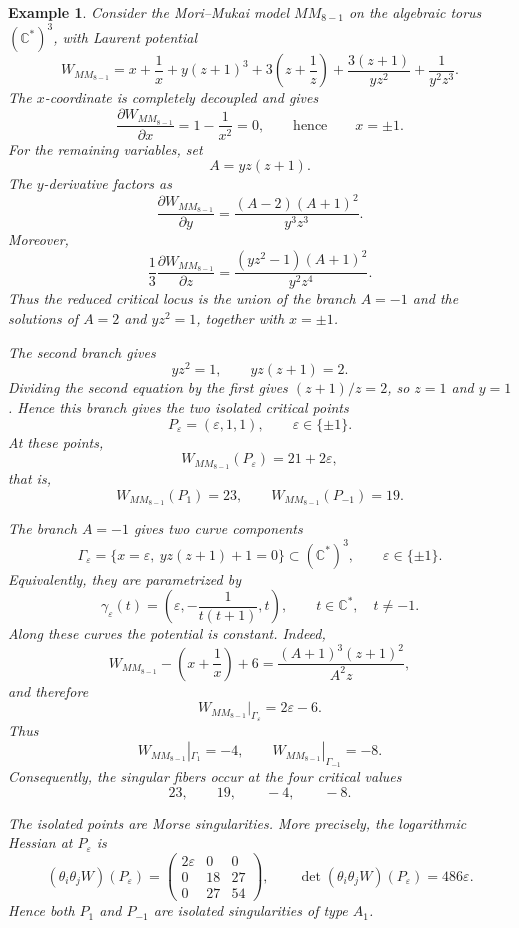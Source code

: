\documentclass[11pt]{amsart}
\newtheorem{example}{Example}[section]
\begin{document}
\begin{example}
Consider the Mori--Mukai model $MM_{8-1}$ on the algebraic torus
$(\mathbb{C}^*)^3$, with Laurent potential
\[
W_{MM_{8-1}}=x+\frac{1}{x}+y(z+1)^3
+3\left(z+\frac{1}{z}\right)
+\frac{3(z+1)}{yz^2}+\frac{1}{y^2z^3}.
\]
The $x$-coordinate is completely decoupled and gives
\[
\frac{\partial W_{MM_{8-1}}}{\partial x}=1-\frac{1}{x^2}=0,
\qquad\text{hence}\qquad
x=\pm1.
\]
For the remaining variables, set
\[
A=yz(z+1).
\]
The $y$-derivative factors as
\[
\frac{\partial W_{MM_{8-1}}}{\partial y}
=\frac{(A-2)(A+1)^2}{y^3z^3}.
\]
Moreover,
\[
\frac{1}{3}\frac{\partial W_{MM_{8-1}}}{\partial z}
=\frac{(yz^2-1)(A+1)^2}{y^2z^4}.
\]
Thus the reduced critical locus is the union of the branch $A=-1$ and the
solutions of $A=2$ and $yz^2=1$, together with $x=\pm1$.

The second branch gives
\[
yz^2=1,
\qquad
yz(z+1)=2.
\]
Dividing the second equation by the first gives $(z+1)/z=2$, so $z=1$ and
$y=1$. Hence this branch gives the two isolated critical points
\[
P_{\varepsilon}=(\varepsilon,1,1),
\qquad
\varepsilon\in\{\pm1\}.
\]
At these points,
\[
W_{MM_{8-1}}(P_{\varepsilon})=21+2\varepsilon,
\]
that is,
\[
W_{MM_{8-1}}(P_1)=23,
\qquad
W_{MM_{8-1}}(P_{-1})=19.
\]

The branch $A=-1$ gives two curve components
\[
\Gamma_{\varepsilon}
=\{x=\varepsilon,\ yz(z+1)+1=0\}
\subset (\mathbb{C}^*)^3,
\qquad
\varepsilon\in\{\pm1\}.
\]
Equivalently, they are parametrized by
\[
\gamma_{\varepsilon}(t)=\left(
\varepsilon,
-\frac{1}{t(t+1)},
t
\right),
\qquad
t\in\mathbb{C}^*,\quad t\neq -1.
\]
Along these curves the potential is constant. Indeed,
\[
W_{MM_{8-1}}-\left(x+\frac{1}{x}\right)+6
=\frac{(A+1)^3(z+1)^2}{A^2z},
\]
and therefore
\[
W_{MM_{8-1}}|_{\Gamma_{\varepsilon}}=2\varepsilon-6.
\]
Thus
\[
W_{MM_{8-1}}|_{\Gamma_1}=-4,
\qquad
W_{MM_{8-1}}|_{\Gamma_{-1}}=-8.
\]
Consequently, the singular fibers occur at the four critical values
\[
23,
\qquad
19,
\qquad
-4,
\qquad
-8.
\]

The isolated points are Morse singularities. More precisely, the logarithmic
Hessian at $P_{\varepsilon}$ is
\[
(\theta_i\theta_jW)(P_{\varepsilon})=
\begin{pmatrix}
2\varepsilon & 0 & 0 \\
0 & 18 & 27 \\
0 & 27 & 54
\end{pmatrix},
\qquad
\det(\theta_i\theta_jW)(P_{\varepsilon})=486\varepsilon.
\]
Hence both $P_1$ and $P_{-1}$ are isolated singularities of type $A_1$.


\end{example}
\end{document}
